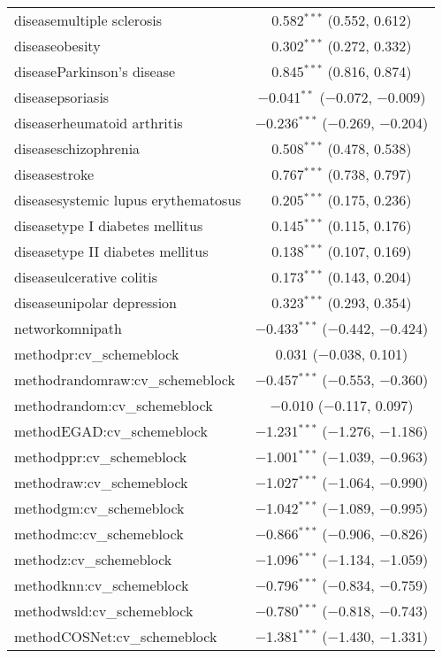 \begin{table}[!htbp]
\begin{tabular}{@{\extracolsep{5pt}}lc}
  diseasemultiple sclerosis & 0.582$^{***}$ (0.552, 0.612) \\ 
  diseaseobesity & 0.302$^{***}$ (0.272, 0.332) \\ 
  diseaseParkinson's disease & 0.845$^{***}$ (0.816, 0.874) \\ 
  diseasepsoriasis & $-$0.041$^{**}$ ($-$0.072, $-$0.009) \\ 
  diseaserheumatoid arthritis & $-$0.236$^{***}$ ($-$0.269, $-$0.204) \\ 
  diseaseschizophrenia & 0.508$^{***}$ (0.478, 0.538) \\ 
  diseasestroke & 0.767$^{***}$ (0.738, 0.797) \\ 
  diseasesystemic lupus erythematosus & 0.205$^{***}$ (0.175, 0.236) \\ 
  diseasetype I diabetes mellitus & 0.145$^{***}$ (0.115, 0.176) \\ 
  diseasetype II diabetes mellitus & 0.138$^{***}$ (0.107, 0.169) \\ 
  diseaseulcerative colitis & 0.173$^{***}$ (0.143, 0.204) \\ 
  diseaseunipolar depression & 0.323$^{***}$ (0.293, 0.354) \\ 
  networkomnipath & $-$0.433$^{***}$ ($-$0.442, $-$0.424) \\ 
  methodpr:cv\_schemeblock & 0.031 ($-$0.038, 0.101) \\ 
  methodrandomraw:cv\_schemeblock & $-$0.457$^{***}$ ($-$0.553, $-$0.360) \\ 
  methodrandom:cv\_schemeblock & $-$0.010 ($-$0.117, 0.097) \\ 
  methodEGAD:cv\_schemeblock & $-$1.231$^{***}$ ($-$1.276, $-$1.186) \\ 
  methodppr:cv\_schemeblock & $-$1.001$^{***}$ ($-$1.039, $-$0.963) \\ 
  methodraw:cv\_schemeblock & $-$1.027$^{***}$ ($-$1.064, $-$0.990) \\ 
  methodgm:cv\_schemeblock & $-$1.042$^{***}$ ($-$1.089, $-$0.995) \\ 
  methodmc:cv\_schemeblock & $-$0.866$^{***}$ ($-$0.906, $-$0.826) \\ 
  methodz:cv\_schemeblock & $-$1.096$^{***}$ ($-$1.134, $-$1.059) \\ 
  methodknn:cv\_schemeblock & $-$0.796$^{***}$ ($-$0.834, $-$0.759) \\ 
  methodwsld:cv\_schemeblock & $-$0.780$^{***}$ ($-$0.818, $-$0.743) \\ 
  methodCOSNet:cv\_schemeblock & $-$1.381$^{***}$ ($-$1.430, $-$1.331) \\ 

\end{tabular}
\end{table}

